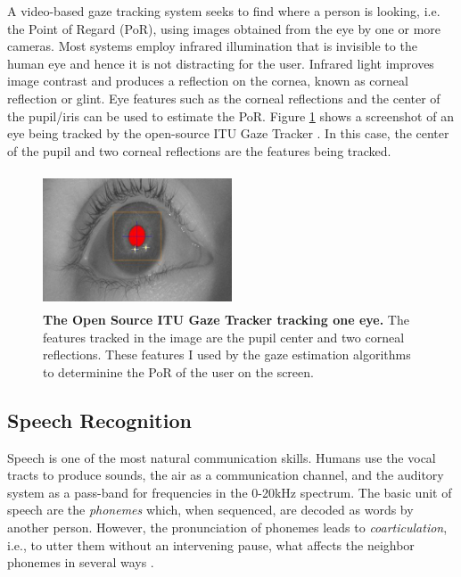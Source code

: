 \documentclass[]{article}
\begin{document}
A video-based gaze tracking system seeks to find where a person is looking, i.e. the Point of Regard (PoR), using images
obtained from the eye by one or more cameras. Most systems employ infrared illumination that is invisible to the human
eye and hence it is not distracting for the user. Infrared light improves image contrast and produces a reflection on
the cornea, known as corneal reflection or glint. Eye features such as the corneal reflections and the center of the
pupil/iris can be used to estimate the PoR. Figure \ref{screenGazeTracker} shows a screenshot of an eye being tracked by
the open-source ITU Gaze Tracker \cite{lowcostitugazetracker,Rozado2012}. In this case, the center of the pupil and two
corneal reflections are the features being tracked.


\begin{figure}[ht]
\begin{center}
\includegraphics[width=0.5\textwidth, height=40mm]{figures/screenGazeTracker.jpg}
\vspace{-3mm}
\end{center}
\caption{\textbf{The Open Source ITU Gaze Tracker tracking one eye.} The
features tracked in the image are the pupil center and two corneal reflections. These features I used by the gaze 
estimation algorithms to determinine the PoR of the user on the screen.}
\label{screenGazeTracker}
\end{figure}


\subsection{Speech Recognition}
Speech is one of the most natural communication skills. Humans use the vocal tracts to produce sounds, the air as a
communication channel, and the auditory system as a pass-band for frequencies in the 0-20kHz spectrum. The basic unit of
speech are the \textit{phonemes} which, when sequenced, are decoded as words by another person. However, the
pronunciation of phonemes leads to \textit{coarticulation}, i.e., to utter them without an intervening pause, what
affects the neighbor phonemes in several ways \cite{Douglas2008}.
\end{document}
